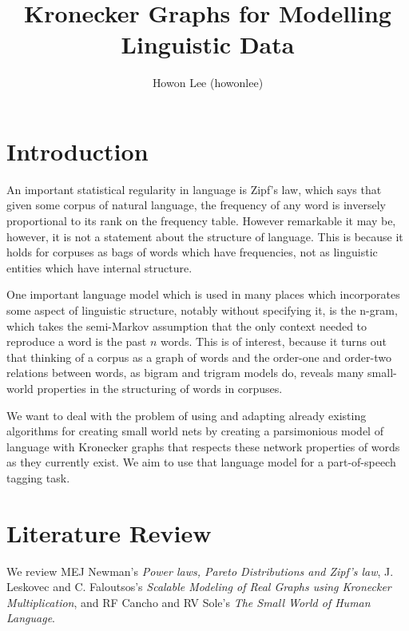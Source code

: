 \documentclass[12pt]{article}
\begin{document}
\title{Kronecker Graphs for Modelling Linguistic Data}
\author{Howon Lee (howonlee)}
\maketitle

\section{Introduction}

An important statistical regularity in language is Zipf's law, which says that given some corpus of natural language, the frequency of any word is inversely proportional to its rank on the frequency table. However remarkable it may be, however, it is not a statement about the structure of language. This is because it holds for corpuses as bags of words which have frequencies, not as linguistic entities which have internal structure. \cite{smallworldlang}

One important language model which is used in many places which incorporates some aspect of linguistic structure, notably without specifying it, is the n-gram, which takes the semi-Markov assumption that the only context needed to reproduce a word is the past $n$ words. This is of interest, because it turns out that thinking of a corpus as a graph of words and the order-one and order-two relations between words, as bigram and trigram models do, reveals many small-world properties in the structuring of words in corpuses.

We want to deal with the problem of using and adapting already existing algorithms for creating small world nets by creating a parsimonious model of language with Kronecker graphs that respects these network properties of words as they currently exist. We aim to use that language model for a part-of-speech tagging task.

\section{Literature Review}


We review MEJ Newman's \emph{Power laws, Pareto Distributions and Zipf's law}\cite{mejpowerlaw}, J. Leskovec and C. Faloutsos's \emph{Scalable Modeling of Real Graphs using Kronecker Multiplication}\cite{kronfit}, and RF Cancho and RV Sole's \emph{The Small World of Human Language}\cite{smallworldlang}.
\end{document}

